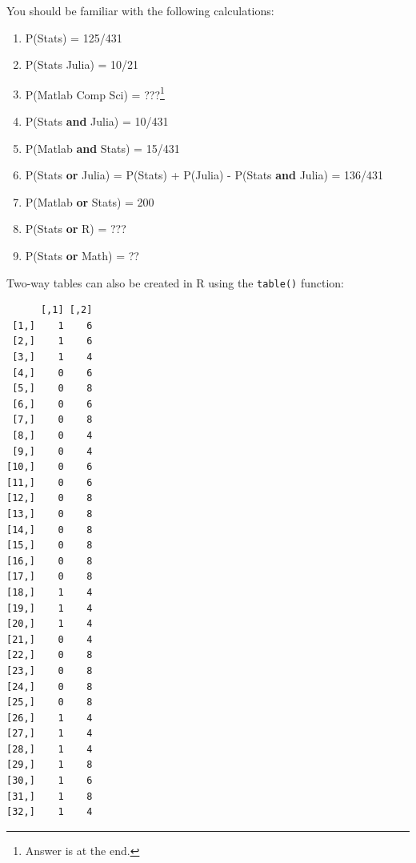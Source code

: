 \documentclass[
  letterpaper,
  DIV=11,
  numbers=noendperiod]{scrreprt}
\newenvironment{Shaded}{\begin{snugshade}}{\end{snugshade}}
\newcommand{\CommentTok}[1]{\textcolor[rgb]{0.37,0.37,0.37}{#1}}
\newcommand{\FunctionTok}[1]{\textcolor[rgb]{0.28,0.35,0.67}{#1}}
\newcommand{\NormalTok}[1]{\textcolor[rgb]{0.00,0.23,0.31}{#1}}
\newcommand{\SpecialCharTok}[1]{\textcolor[rgb]{0.37,0.37,0.37}{#1}}
\providecommand{\tightlist}{%
  \setlength{\itemsep}{0pt}\setlength{\parskip}{0pt}}\usepackage{longtable,booktabs,array}
\begin{document}
You should be familiar with the following calculations:

\begin{enumerate}
\def\labelenumi{\arabic{enumi}.}
\tightlist
\item
  P(Stats) = 125/431
\item
  P(Stats \textbar{} Julia) = 10/21
\item
  P(Matlab \textbar{} Comp Sci) = ???\footnote{Answer is at the end.}
\item
  P(Stats \textbf{and} Julia) = 10/431
\item
  P(Matlab \textbf{and} Stats) = 15/431
\item
  P(Stats \textbf{or} Julia) = P(Stats) + P(Julia) - P(Stats
  \textbf{and} Julia) = 136/431
\item
  P(Matlab \textbf{or} Stats) = 200
\item
  P(Stats \textbf{or} R) = ???
\item
  P(Stats \textbf{or} Math) = ??
\end{enumerate}

Two-way tables can also be created in R using the \texttt{table()}
function:

\begin{Shaded}
\end{Shaded}

\begin{verbatim}
      [,1] [,2]
 [1,]    1    6
 [2,]    1    6
 [3,]    1    4
 [4,]    0    6
 [5,]    0    8
 [6,]    0    6
 [7,]    0    8
 [8,]    0    4
 [9,]    0    4
[10,]    0    6
[11,]    0    6
[12,]    0    8
[13,]    0    8
[14,]    0    8
[15,]    0    8
[16,]    0    8
[17,]    0    8
[18,]    1    4
[19,]    1    4
[20,]    1    4
[21,]    0    4
[22,]    0    8
[23,]    0    8
[24,]    0    8
[25,]    0    8
[26,]    1    4
[27,]    1    4
[28,]    1    4
[29,]    1    8
[30,]    1    6
[31,]    1    8
[32,]    1    4
\end{verbatim}

\begin{Shaded}
\end{Shaded}
\end{document}
